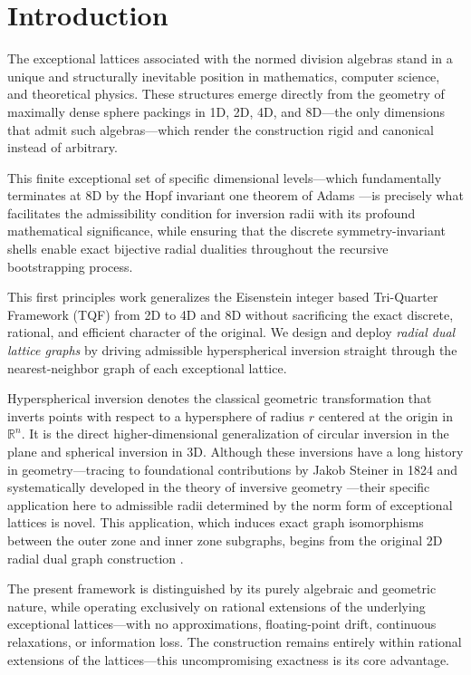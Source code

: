 \documentclass{article}
\begin{document}
\section{Introduction}
\label{sec:introduction}

The exceptional lattices associated with the normed division algebras stand in a unique and structurally inevitable position in mathematics, computer science, and theoretical physics. These structures emerge directly from the geometry of maximally dense sphere packings \cite{Viazovska2017,Cohn2021} in 1D, 2D, 4D, and 8D---the only dimensions that admit such algebras---which render the construction rigid and canonical instead of arbitrary.

This finite exceptional set of specific dimensional levels---which fundamentally terminates at 8D by the Hopf invariant one theorem of Adams \cite{Adams1960}---is precisely what facilitates the admissibility condition for inversion radii with its profound mathematical significance, while ensuring that the discrete symmetry-invariant shells enable exact bijective radial dualities throughout the recursive bootstrapping process.

This first principles work generalizes the Eisenstein integer based Tri-Quarter Framework (TQF) \cite{Schmidt2025} from 2D to 4D and 8D without sacrificing the exact discrete, rational, and efficient character of the original. We design and deploy \emph{radial dual lattice graphs} by driving admissible hyperspherical inversion straight through the nearest-neighbor graph of each exceptional lattice.

Hyperspherical inversion denotes the classical geometric transformation that inverts points with respect to a hypersphere of radius $r$ centered at the origin in $\mathbb{R}^n$. It is the direct higher-dimensional generalization of circular inversion in the plane and spherical inversion in 3D. Although these inversions have a long history in geometry---tracing to foundational contributions by Jakob Steiner in 1824 and systematically developed in the theory of inversive geometry \cite{MorleyMorley1933,Coxeter1969}---their specific application here to admissible radii determined by the norm form of exceptional lattices is novel. This application, which induces exact graph isomorphisms between the outer zone and inner zone subgraphs, begins from the original 2D radial dual graph construction \cite{Schmidt2025}.

The present framework is distinguished by its purely algebraic and geometric nature, while operating exclusively on rational extensions of the underlying exceptional lattices---with no approximations, floating-point drift, continuous relaxations, or information loss. The construction remains entirely within rational extensions of the lattices---this uncompromising exactness is its core advantage.
\end{document}
